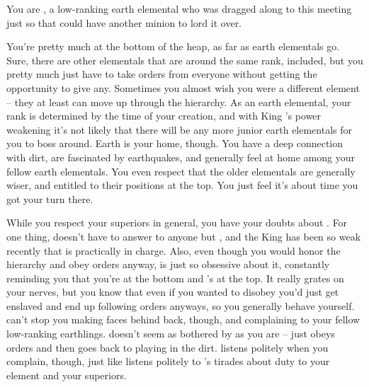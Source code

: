 \documentclass[char]{elementals}
\begin{document}
\name{\cMiniEarth{}}

You are \cMiniEarth{\intro}, a low-ranking earth elemental who was dragged along to this meeting just so that \cLoyal{\intro} could have another minion to lord it over.

You're pretty much at the bottom of the heap, as far as earth elementals go.  Sure, there are other elementals that are around the same rank, \cMinion{\intro} included, but you pretty much just have to take orders from everyone without getting the opportunity to give any.  Sometimes you almost wish you were a different element -- they at least can move up through the hierarchy.  As an earth elemental, your rank is determined by the time of your creation, and with King \cEarthKing{}'s power weakening it's not likely that there will be any more junior earth elementals for you to boss around.  Earth is your home, though.  You have a deep connection with dirt, are fascinated by earthquakes, and generally feel at home among your fellow earth elementals.  You even respect that the older elementals are generally wiser, and entitled to their positions at the top.  You just feel it's about time you got your turn there.

While you respect your superiors in general, you have your doubts about \cLoyal{}.  For one thing, \cLoyal{\they} doesn't have to answer to anyone but \cEarthKing{}, and the King has been so weak recently that \cLoyal{} is practically in charge.  Also, even though you would honor the hierarchy and obey orders anyway, \cLoyal{\they} is just so obsessive about it, constantly reminding you that you're at the bottom and \cLoyal{\they}'s at the top.  It really grates on your nerves, but you know that even if you wanted to disobey you'd just get enslaved and end up following orders anyways, so you generally behave yourself.  \cLoyal{} can't stop you making faces behind \cLoyal{\their} back, though, and complaining to your fellow low-ranking earthlings.  \cMinion{} doesn't seem as bothered by \cLoyal{} as you are -- \cMinion{\they} just obeys orders and then goes back to playing in the dirt.  \cMinion{\They} listens politely when you complain, though, just like \cMinion{\they} listens politely to \cLoyal{}'s tirades about duty to your element and your superiors.
\end{document}
